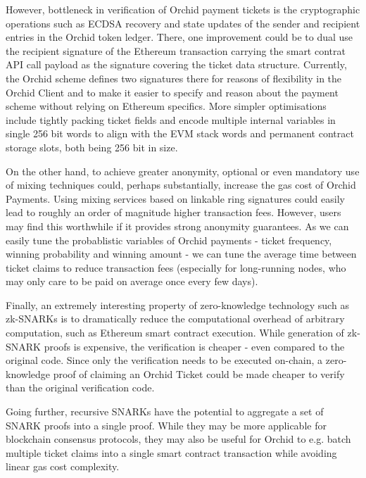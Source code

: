 However, bottleneck in verification of Orchid payment tickets is the cryptographic operations such as ECDSA recovery and state updates of the sender and recipient entries in the Orchid token ledger. There, one improvement could be to dual use the recipient signature of the Ethereum transaction carrying the smart contrat API call payload as the signature covering the ticket data structure. Currently, the Orchid scheme defines two signatures there for reasons of flexibility in the Orchid Client and to make it easier to specify and reason about the payment scheme without relying on Ethereum specifics. More simpler optimisations include tightly packing ticket fields and encode multiple internal variables in single 256 bit words to align with the EVM stack words and permanent contract storage slots, both being 256 bit in size.

On the other hand, to achieve greater anonymity, optional or even mandatory use of mixing techniques could, perhaps substantially, increase the gas cost of Orchid Payments. Using mixing services based on linkable ring signatures could easily lead to roughly an order of magnitude higher transaction fees\cite{ETHRingSigs}. However, users may find this worthwhile if it provides strong anonymity guarantees. As we can easily tune the probablistic variables of Orchid payments - ticket frequency, winning probability and winning amount - we can tune the average time between ticket claims to reduce transaction fees (especially for long-running nodes, who may only care to be paid on average once every few days).

Finally, an extremely interesting property of zero-knowledge technology such as zk-SNARKs is to dramatically reduce the computational overhead of arbitrary computation, such as Ethereum smart contract execution\cite{zksnarks-blockchain}. While generation of zk-SNARK proofs is expensive, the verification is cheaper - even compared to the original code. Since only the verification needs to be executed on-chain, a zero-knowledge proof of claiming an Orchid Ticket could be made cheaper to verify than the original verification code.

Going further, recursive SNARKs \cite{RecursiveSnarks} have the potential to aggregate a set of SNARK proofs into a single proof. While they may be more applicable for blockchain consensus protocols\cite{ScalingTezos}, they may also be useful for Orchid to e.g. batch multiple ticket claims into a single smart contract transaction while avoiding linear gas cost complexity.
